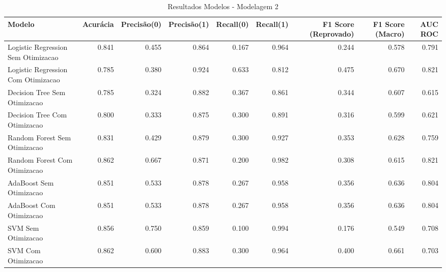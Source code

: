 \begin{table}[H] %
    \centering
    \caption{Resultados Modelos - Modelagem 2}
    \label{tab:resultados_modelagem_2}
    \renewcommand{\arraystretch}{1.25} %
    \begin{adjustwidth}{ -1in }{ -1in } %
    \centering %
    \small %
    \begin{tabular}{lrrrrrrrr}
\toprule
                            Modelo &  Acurácia &  Precisão(0) &  Precisão(1) &  Recall(0) &  Recall(1) &  F1 Score (Reprovado) &  F1 Score (Macro) &  AUC ROC \\
\midrule
Logistic Regression Sem Otimizacao &     0.841 &        0.455 &        0.864 &      0.167 &      0.964 &                 0.244 &             0.578 &    0.791 \\
Logistic Regression Com Otimizacao &     0.785 &        0.380 &        0.924 &      0.633 &      0.812 &                 0.475 &             0.670 &    0.821 \\
      Decision Tree Sem Otimizacao &     0.785 &        0.324 &        0.882 &      0.367 &      0.861 &                 0.344 &             0.607 &    0.615 \\
      Decision Tree Com Otimizacao &     0.800 &        0.333 &        0.875 &      0.300 &      0.891 &                 0.316 &             0.599 &    0.621 \\
      Random Forest Sem Otimizacao &     0.831 &        0.429 &        0.879 &      0.300 &      0.927 &                 0.353 &             0.628 &    0.759 \\
      Random Forest Com Otimizacao &     0.862 &        0.667 &        0.871 &      0.200 &      0.982 &                 0.308 &             0.615 &    0.821 \\
           AdaBoost Sem Otimizacao &     0.851 &        0.533 &        0.878 &      0.267 &      0.958 &                 0.356 &             0.636 &    0.804 \\
           AdaBoost Com Otimizacao &     0.851 &        0.533 &        0.878 &      0.267 &      0.958 &                 0.356 &             0.636 &    0.804 \\
                SVM Sem Otimizacao &     0.856 &        0.750 &        0.859 &      0.100 &      0.994 &                 0.176 &             0.549 &    0.708 \\
                SVM Com Otimizacao &     0.862 &        0.600 &        0.883 &      0.300 &      0.964 &                 0.400 &             0.661 &    0.703 \\
\bottomrule
\end{tabular}
    \end{adjustwidth}
    \renewcommand{\arraystretch}{1.0} %
\end{table}
